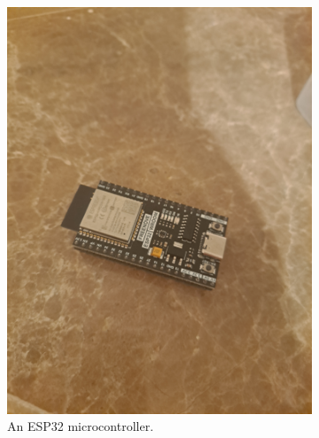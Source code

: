 \documentclass[11pt]{article}
\begin{document}
\begin{figure}[h!]
\centering

\begin{subfigure}[b]{0.3\textwidth}
    \centering
    \includegraphics[width=\textwidth]{ESP32Img.jpg}
    \caption{An ESP32 microcontroller.}
    \label{fig:figure1}
\end{subfigure}
\hfill
\begin{subfigure}[b]{0.3\textwidth}
    \centering

\end{subfigure}
\end{figure}
\end{document}
